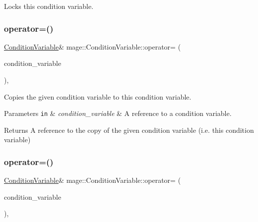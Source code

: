 Locks this condition variable. \hypertarget{classmage_1_1_condition_variable_ac83eae5353cd004ee06fe2376e5bdbf4}{}\label{classmage_1_1_condition_variable_ac83eae5353cd004ee06fe2376e5bdbf4} 
\subsubsection{\texorpdfstring{operator=()}{operator=()}\hspace{0.1cm}{\footnotesize\ttfamily [1/2]}}
{\footnotesize\ttfamily \hyperlink{classmage_1_1_condition_variable}{Condition\+Variable}\& mage\+::\+Condition\+Variable\+::operator= (\begin{DoxyParamCaption}\item[{const \hyperlink{classmage_1_1_condition_variable}{Condition\+Variable} \&}]{condition\+\_\+variable }\end{DoxyParamCaption})\hspace{0.3cm}{\ttfamily [private]}, {\ttfamily [delete]}}

Copies the given condition variable to this condition variable.


\begin{DoxyParams}[1]{Parameters}
\mbox{\tt in}  & {\em condition\+\_\+variable} & A reference to a condition variable. \\
\hline
\end{DoxyParams}
\begin{DoxyReturn}{Returns}
A reference to the copy of the given condition variable (i.\+e. this condition variable) 
\end{DoxyReturn}
\hypertarget{classmage_1_1_condition_variable_a3f05c5b53b2530e9fdd1bb890aa375c4}{}\label{classmage_1_1_condition_variable_a3f05c5b53b2530e9fdd1bb890aa375c4} 
\subsubsection{\texorpdfstring{operator=()}{operator=()}\hspace{0.1cm}{\footnotesize\ttfamily [2/2]}}
{\footnotesize\ttfamily \hyperlink{classmage_1_1_condition_variable}{Condition\+Variable}\& mage\+::\+Condition\+Variable\+::operator= (\begin{DoxyParamCaption}\item[{\hyperlink{classmage_1_1_condition_variable}{Condition\+Variable} \&\&}]{condition\+\_\+variable }\end{DoxyParamCaption})\hspace{0.3cm}{\ttfamily [private]}, {\ttfamily [delete]}}

